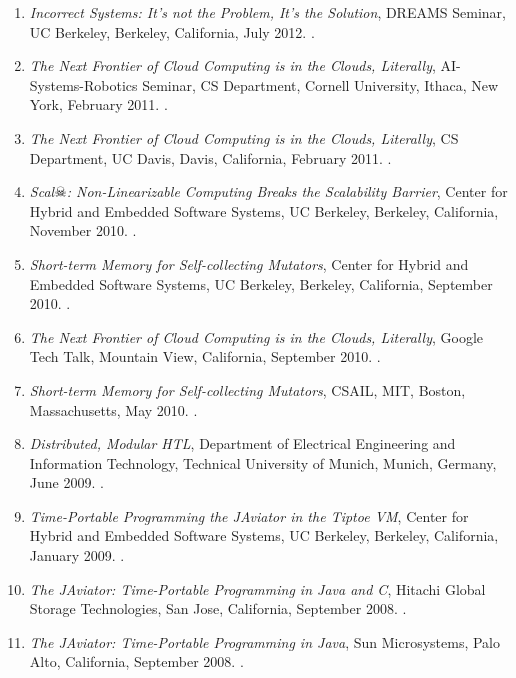 {\begin{enumerate}
\item \emph{Incorrect Systems: It's not the Problem, It's the Solution},
DREAMS Seminar, UC Berkeley, Berkeley, California, July 2012.
.

\item \emph{The Next Frontier of Cloud Computing is in the Clouds, Literally}, AI-Systems-Robotics Seminar, CS Department, Cornell University, Ithaca, New York, February 2011.
.

\item \emph{The Next Frontier of Cloud Computing is in the Clouds, Literally}, CS Department, UC Davis, Davis, California, February 2011.
.

\item \emph{Scal$\skull$: Non-Linearizable Computing Breaks the Scalability Barrier},
Center for Hybrid and Embedded Software Systems, UC Berkeley, Berkeley, California, November 2010.
.

\item \emph{Short-term Memory for Self-collecting Mutators},
Center for Hybrid and Embedded Software Systems, UC Berkeley, Berkeley, California, September 2010.
.

\item \emph{The Next Frontier of Cloud Computing is in the Clouds, Literally}, Google Tech Talk, Mountain View, California, September 2010.
.

\item \emph{Short-term Memory for Self-collecting Mutators}, CSAIL, MIT, Boston, Massachusetts, May 2010.
.

\item \emph{Distributed, Modular HTL},
Department of Electrical Engineering and Information Technology, Technical University of Munich, Munich, Germany, June 2009.
.

\item \emph{Time-Portable Programming the JAviator in the Tiptoe VM},
Center for Hybrid and Embedded Software Systems, UC Berkeley, Berkeley, California, January 2009.
.

\item \emph{The JAviator: Time-Portable Programming in Java and C},
Hitachi Global Storage Technologies, San Jose, California, September 2008.
.

\item \emph{The JAviator: Time-Portable Programming in Java},
Sun Microsystems, Palo Alto, California, September 2008.
.


\end{enumerate}}
